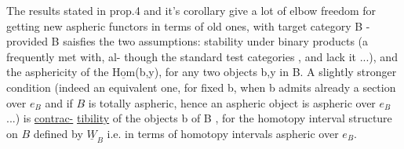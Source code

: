 The results stated in prop.4  and it's corollary give a lot of elbow
freedom for getting new aspheric functors in terms of old ones,  with
target category B  -  provided B saisfies the two assumptions:  
stability under binary products (a  frequently met with,  al-%
though the standard test categories \hand{$\Delta$},\hand{$\Box$} and \hand{\unsure{$\Diamond$}} lack it ...),  and the
 asphericity of the  $\underline{\mathrm{Hom}}$(b,y),  for any two objects b,y
in B.  A slightly stronger condition (indeed an equivalent one,  for
fixed b,  when b admits already a section over $e_{B\hat{}}$  and if $B\hat{}$ is totally
aspheric,  hence an aspheric object is  aspheric over $e_{B\hat{}}$ ...) is \uline{contrac-}%
\uline{tibility} of the objects b of B ,  for the homotopy interval structure on
$B\hat{}$ defined by $\underline{W}_B$ \hand{(}i.e. in terms of homotopy intervals aspheric over $e_{B\hat{}}$\hand{)}.

